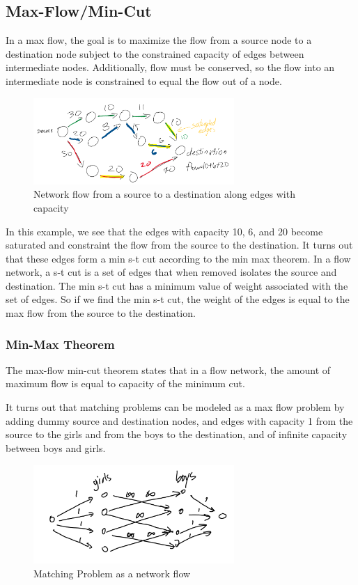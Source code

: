 \documentclass[twoside]{article}
\begin{document}
\subsection{Max-Flow/Min-Cut}
In a max flow, the goal is to maximize the flow from a source node to a destination node subject to the constrained capacity of edges between intermediate nodes. Additionally, flow must be conserved, so the flow into an intermediate node is constrained to equal the flow out of a node.

\begin{figure}[!ht]
  \includegraphics[width=3in]{network_flow.png}
  \caption{Network flow from a source to a destination along edges with capacity}
  \label{fig:network_flow}
\end{figure}

In this example, we see that the edges with capacity 10, 6, and 20 become saturated and constraint the flow from the source to the destination. It turns out that these edges form a min s-t cut according to the min max theorem. In a flow network, a s-t cut is a set of edges that when removed isolates the source and destination. The min s-t cut has a minimum value of weight associated with the set of edges. So if we find the min s-t cut, the weight of the edges is equal to the max flow from the source to the destination.

\newpage
\subsubsection{ Min-Max Theorem}
The max-flow min-cut theorem states that in a flow network, the amount of maximum flow is equal to capacity of the minimum cut.

It turns out that matching problems can be modeled as a max flow problem by adding dummy source and destination nodes, and edges with  capacity 1 from the source to the girls and from the boys to the destination, and of infinite capacity between boys and girls.

\begin{figure}[!ht]
  \includegraphics[width=3in]{matching_flow.png}
  \caption{Matching Problem as a network flow}
  \label{fig:matching_flow}
\end{figure}
\end{document}
